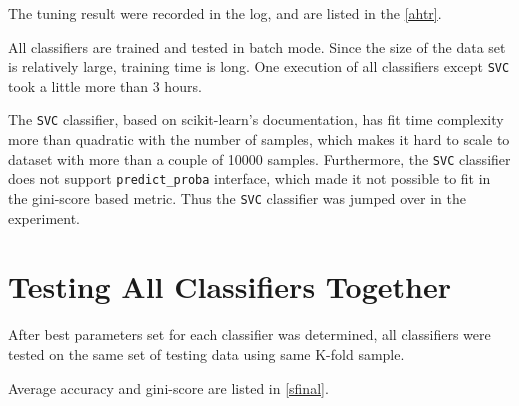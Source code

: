 \documentclass[12pt]{article}
\begin{document}
The tuning result were recorded in the log, and are listed in the \cref{ahtr}.

All classifiers are trained and tested in batch mode. Since the size of the data set is relatively large, training time is long.
One execution of all classifiers except \verb|SVC| took a little more than 3 hours.

The \verb|SVC| classifier, based on scikit-learn's documentation, has fit time complexity more than quadratic with the number of samples, which makes it hard to scale to dataset with more than a couple of 10000 samples. Furthermore, the \verb|SVC| classifier does not support \verb|predict_proba| interface, which made it not possible to fit in the gini-score based metric. Thus the \verb|SVC| classifier was jumped over in the experiment.

\section{Testing All Classifiers Together}

After best parameters set for each classifier was determined, all classifiers were
tested on the same set of testing data using same K-fold sample.

Average accuracy and gini-score are listed in \cref{sfinal}.
\end{document}
